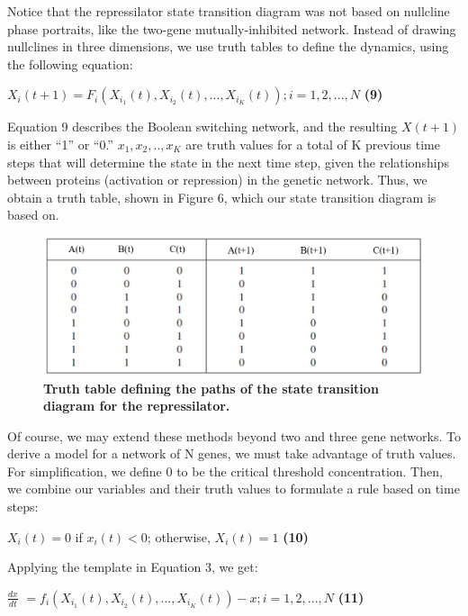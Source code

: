 \documentclass[11pt]{article}
\begin{document}
Notice that the repressilator state transition diagram was not based on nullcline phase portraits, like the two-gene mutually-inhibited network. Instead of drawing nullclines in three dimensions, we use truth tables to define the dynamics, using the following equation:

\begin{center}
$X_i(t+1) = F_i(X_{i_1}(t), X_{i_2}(t),...,X_{i_K}(t));  i = 1, 2,...,N $ \quad \textbf{(9)}
\end{center}

Equation 9 describes the Boolean switching network, and the resulting $X(t+1)$ is either “1” or “0.” $x_1, x_2,..,x_K$ are truth values for a total of K previous time steps that will determine the state in the next time step, given the relationships between proteins (activation or repression) in the genetic network. Thus, we obtain a truth table, shown in Figure 6, which our state transition diagram is based on.

\begin{figure}[H]
\includegraphics[scale=0.5]{Table1}
\centering
\caption{\textbf{Truth table defining the paths of the state transition diagram for the repressilator.}}
\end{figure}

Of course, we may extend these methods beyond two and three gene networks. To derive a model for a network of N genes, we must take advantage of truth values. For simplification, we define 0 to be the critical threshold concentration. Then, we combine our variables and their truth values to formulate a rule based on time steps:

\begin{center}
$X_i(t) = 0$ if $x_i(t) < 0$; otherwise, $X_i(t) = 1$ \quad \textbf{(10)}
\end{center}

Applying the template in Equation 3, we get:

\begin{center}
\( \frac{dx}{dt}\) $= f_i(X_{i_1}(t), X_{i_2}(t),...,X_{i_K}(t)) -  x;  i = 1, 2,...,N $ \quad \textbf{(11)}
\end{center}
\end{document}
